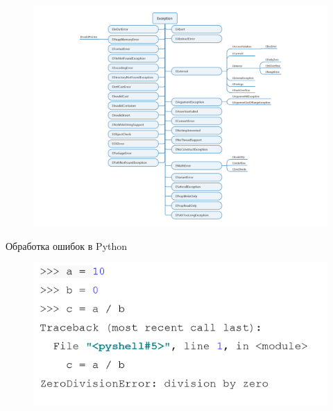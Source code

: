 \documentclass[xcolor=table]{beamer}
\begin{document}
\begin{frame}
	\begin{figure}[h]
		\centering
		\includegraphics[scale=0.7]{images/lec08-pic08.png}
	\end{figure}
\end{frame}

\begin{frame}{Обработка ошибок в Python}
	\begin{figure}[h]
		\centering
		\includegraphics[scale=0.7]{images/lec08-pic01-python.png}
	\end{figure}
\end{frame}
\end{document}
